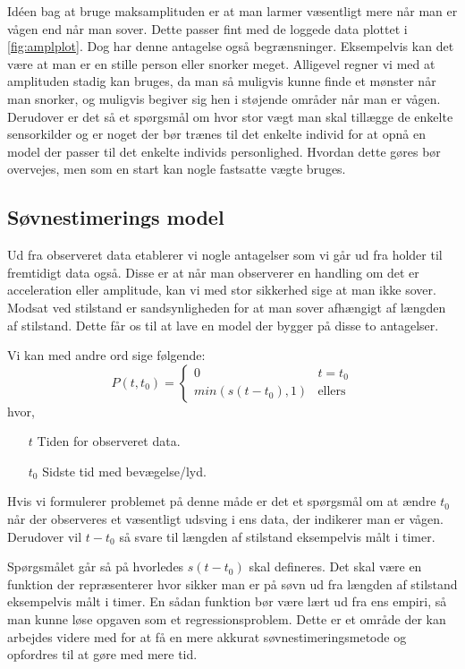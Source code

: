 Idéen bag at bruge maksamplituden er at man larmer væsentligt mere når man er vågen end når man sover.
Dette passer fint med de loggede data plottet i \cref{fig:amplplot}.
Dog har denne antagelse også begrænsninger.
Eksempelvis kan det være at man er en stille person eller snorker meget.
Alligevel regner vi med at amplituden stadig kan bruges, da man så muligvis kunne finde et mønster når man snorker, og muligvis begiver sig hen i støjende områder når man er vågen. Derudover er det så et spørgsmål om hvor stor vægt man skal tillægge de enkelte sensorkilder og er noget der bør trænes til det enkelte individ for at opnå en model der passer til det enkelte individs personlighed.
Hvordan dette gøres bør overvejes, men som en start kan nogle fastsatte vægte bruges.

\subsection{Søvnestimerings model}
Ud fra observeret data etablerer vi nogle antagelser som vi går ud fra holder til fremtidigt data også.
Disse er at når man observerer en handling om det er acceleration eller amplitude, kan vi med stor sikkerhed sige at man ikke sover.
Modsat ved stilstand er sandsynligheden for at man sover afhængigt af længden af stilstand.
Dette får os til at lave en model der bygger på disse to antagelser.

Vi kan med andre ord sige følgende:
\begin{equation}
P(t,t_0) =
\begin{cases}
0	& t = t_0 \\
min(s(t-t_0),1) & \text{ellers}
\end{cases}
\end{equation}
hvor,
\begin{itemize}
	\item[$t$] Tiden for observeret data.
	\item[$t_0$] Sidste tid med bevægelse/lyd.
\end{itemize}
Hvis vi formulerer problemet på denne måde er det et spørgsmål om at ændre $t_0$ når der observeres et væsentligt udsving i ens data, der indikerer man er vågen.
Derudover vil $t-t_0$ så svare til længden af stilstand eksempelvis målt i timer.

Spørgsmålet går så på hvorledes $s(t-t_0)$ skal defineres.
Det skal være en funktion der repræsenterer hvor sikker man er på søvn ud fra længden af stilstand eksempelvis målt i timer.
En sådan funktion bør være lært ud fra ens empiri, så man kunne løse opgaven som et regressionsproblem.
Dette er et område der kan arbejdes videre med for at få en mere akkurat søvnestimeringsmetode og opfordres til at gøre med mere tid.

